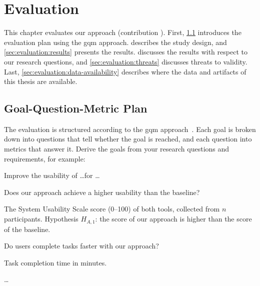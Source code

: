 \chapter{Evaluation}\label{chap:evaluation}

This chapter evaluates our approach (contribution ).
First, \cref{sec:evaluation:gqm} introduces the evaluation plan using the \gls{gqm} approach.
 describes the study design, and \cref{sec:evaluation:results} presents the results.
 discusses the results with respect to our research questions, and \cref{sec:evaluation:threats} discusses threats to validity.
Last, \cref{sec:evaluation:data-availability} describes where the data and artifacts of this thesis are available.

\section{Goal-Question-Metric Plan}\label{sec:evaluation:gqm}

The evaluation is structured according to the \gls{gqm} approach~\cite{Basili1994}.
Each goal is broken down into questions that tell whether the goal is reached, and each question into metrics that answer it.
Derive the goals from your research questions and requirements, for example:

\begin{description}[leftmargin=2.5em, font=\normalfont]
  \item[$\boldsymbol{G}_1$] Improve the usability of \ldots for \ldots
  \begin{description}[leftmargin=2.5em, font=\normalfont]
    \item[$\boldsymbol{Q}_{1,1}$] Does our approach achieve a higher usability than the baseline?
    \begin{description}[leftmargin=3em, font=\normalfont]
      \item[$\boldsymbol{M}_{1,1,1}$] The System Usability Scale score (0--100) of both tools, collected from $n$ participants.
            Hypothesis $H_{A,1}$: the score of our approach is higher than the score of the baseline.
    \end{description}
    \item[$\boldsymbol{Q}_{1,2}$] Do users complete tasks faster with our approach?
    \begin{description}[leftmargin=3em, font=\normalfont]
      \item[$\boldsymbol{M}_{1,2,1}$] Task completion time in minutes.
    \end{description}
  \end{description}
  \item[$\boldsymbol{G}_2$] \ldots
\end{description}

